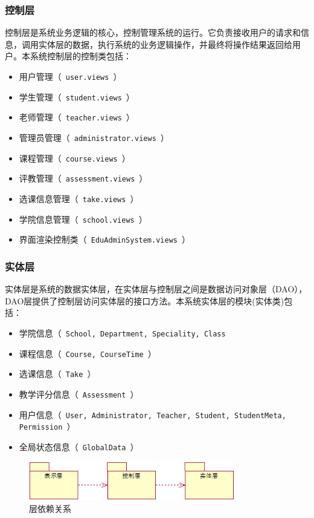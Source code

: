 \subsubsection{控制层}
  
控制层是系统业务逻辑的核心，控制管理系统的运行。它负责接收用户的请求和信息，调用实体层的数据，执行系统的业务逻辑操作，并最终将操作结果返回给用户。本系统控制层的控制类包括：
\begin{itemize}
  \item 用户管理（~\texttt{user.views}~）
  \item 学生管理（~\texttt{student.views}~）
  \item 老师管理（~\texttt{teacher.views}~）
  \item 管理员管理（~\texttt{administrator.views}~）
  \item 课程管理（~\texttt{course.views}~）  
  \item 评教管理（~\texttt{assessment.views}~）
  \item 选课信息管理（~\texttt{take.views}~）
  \item 学院信息管理（~\texttt{school.views}~）
  \item 界面渲染控制类（~\texttt{EduAdminSystem.views}~）
\end{itemize}
  
\subsubsection{实体层}
  
实体层是系统的数据实体层，在实体层与控制层之间是数据访问对象层（DAO），DAO层提供了控制层访问实体层的接口方法。本系统实体层的模块(实体类)包括：
\begin{itemize}
  \item 学院信息（~\texttt{School, Department, Speciality, Class}~
  \item 课程信息（~\texttt{Course, CourseTime}~）
  \item 选课信息（~\texttt{Take}~）
  \item 教学评分信息（~\texttt{Assessment}~）
  \item 用户信息（~\texttt{User, Administrator, Teacher, Student, StudentMeta, Permission}~）
  \item 全局状态信息（~\texttt{GlobalData}~）
\end{itemize}

\begin{figure}[H]
  \centering
  \includegraphics[width=0.8\textwidth]{img/level_depend}
  \caption{层依赖关系}
  \label{fig:level_depend}
\end{figure}

